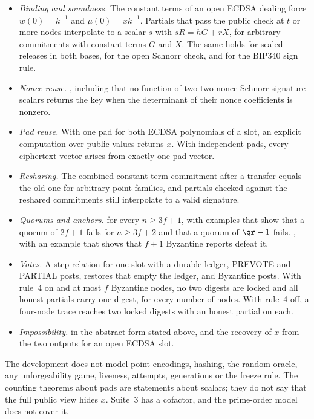 \begin{itemize}[leftmargin=1.5em,itemsep=1pt]
\item \emph{Binding and soundness.} The constant terms of an open ECDSA dealing force $w(0) = k^{-1}$ and $\mu(0) = xk^{-1}$. Partials that pass the public check at $t$ or more nodes interpolate to a scalar $s$ with $sR = hG + rX$, for arbitrary commitments with constant terms $G$ and $X$. The same holds for sealed releases in both bases, for the open Schnorr check, and for the BIP340 sign rule.
\item \emph{Nonce reuse.} , including that no function of two two-nonce Schnorr signature scalars returns the key when the determinant of their nonce coefficients is nonzero.
\item \emph{Pad reuse.} With one pad for both ECDSA polynomials of a slot, an explicit computation over public values returns $x$. With independent pads, every ciphertext vector arises from exactly one pad vector.
\item \emph{Resharing.} The combined constant-term commitment after a transfer equals the old one for arbitrary point families, and partials checked against the reshared commitments still interpolate to a valid signature.
\item \emph{Quorums and anchors.}  for every $n \ge 3f+1$, with examples that show that a quorum of $2f+1$ fails for $n \ge 3f+2$ and that a quorum of $\qr - 1$ fails. , with an example that shows that $f+1$ Byzantine reports defeat it.
\item \emph{Votes.} A step relation for one slot with a durable ledger, PREVOTE and PARTIAL posts, restores that empty the ledger, and Byzantine posts. With rule~4 on and at most $f$ Byzantine nodes, no two digests are locked and all honest partials carry one digest, for every number of nodes. With rule~4 off, a four-node trace reaches two locked digests with an honest partial on each.
\item \emph{Impossibility.}  in the abstract form stated above, and the recovery of $x$ from the two outputs for an open ECDSA slot.
\end{itemize}

The development does not model point encodings, hashing, the random oracle, any unforgeability game, liveness, attempts, generations or the freeze rule. The counting theorems about pads are statements about scalars; they do not say that the full public view hides $x$. Suite~3 has a cofactor, and the prime-order model does not cover it.


